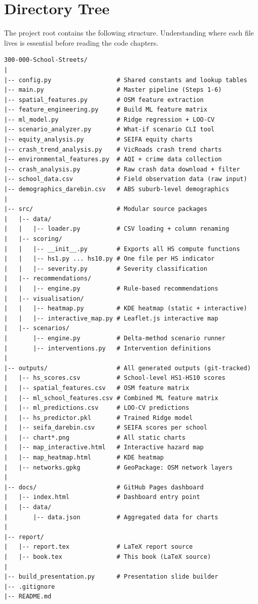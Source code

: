 \documentclass[11pt,a4paper,openany]{book}
\begin{document}
\section{Directory Tree}

The project root contains the following structure. Understanding where each file lives is essential before reading the code chapters.

\begin{lstlisting}[style=text, caption={Project directory structure}]
300-000-School-Streets/
|
|-- config.py                  # Shared constants and lookup tables
|-- main.py                    # Master pipeline (Steps 1-6)
|-- spatial_features.py        # OSM feature extraction
|-- feature_engineering.py     # Build ML feature matrix
|-- ml_model.py                # Ridge regression + LOO-CV
|-- scenario_analyzer.py       # What-if scenario CLI tool
|-- equity_analysis.py         # SEIFA equity charts
|-- crash_trend_analysis.py    # VicRoads crash trend charts
|-- environmental_features.py  # AQI + crime data collection
|-- crash_analysis.py          # Raw crash data download + filter
|-- school_data.csv            # Field observation data (raw input)
|-- demographics_darebin.csv   # ABS suburb-level demographics
|
|-- src/                       # Modular source packages
|   |-- data/
|   |   |-- loader.py          # CSV loading + column renaming
|   |-- scoring/
|   |   |-- __init__.py        # Exports all HS compute functions
|   |   |-- hs1.py ... hs10.py # One file per HS indicator
|   |   |-- severity.py        # Severity classification
|   |-- recommendations/
|   |   |-- engine.py          # Rule-based recommendations
|   |-- visualisation/
|   |   |-- heatmap.py         # KDE heatmap (static + interactive)
|   |   |-- interactive_map.py # Leaflet.js interactive map
|   |-- scenarios/
|       |-- engine.py          # Delta-method scenario runner
|       |-- interventions.py   # Intervention definitions
|
|-- outputs/                   # All generated outputs (git-tracked)
|   |-- hs_scores.csv          # School-level HS1-HS10 scores
|   |-- spatial_features.csv   # OSM feature matrix
|   |-- ml_school_features.csv # Combined ML feature matrix
|   |-- ml_predictions.csv     # LOO-CV predictions
|   |-- hs_predictor.pkl       # Trained Ridge model
|   |-- seifa_darebin.csv      # SEIFA scores per school
|   |-- chart*.png             # All static charts
|   |-- map_interactive.html   # Interactive hazard map
|   |-- map_heatmap.html       # KDE heatmap
|   |-- networks.gpkg          # GeoPackage: OSM network layers
|
|-- docs/                      # GitHub Pages dashboard
|   |-- index.html             # Dashboard entry point
|   |-- data/
|       |-- data.json          # Aggregated data for charts
|
|-- report/
|   |-- report.tex             # LaTeX report source
|   |-- book.tex               # This book (LaTeX source)
|
|-- build_presentation.py      # Presentation slide builder
|-- .gitignore
|-- README.md
\end{lstlisting}
\end{document}
